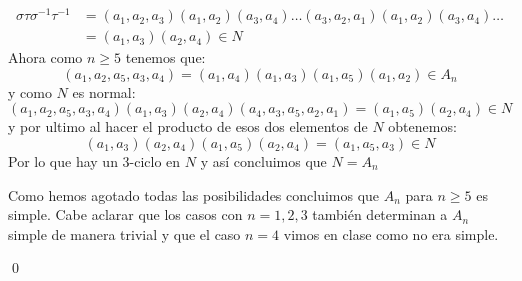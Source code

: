 \begin{homeworkProblem}
\begin{solucion}
\begin{itemize}
\begin{align*}
                    \sigma\tau\sigma^{-1}\tau^{-1}&=(a_1,a_2,a_3)(a_1,a_2)(a_3,a_4)\dotsc(a_3,a_2,a_1)(a_1,a_2)(a_3,a_4)\dotsc\\
                    &=(a_1,a_3)(a_2,a_4)\in N
                \end{align*}
                Ahora como $n\geq 5$ tenemos que:
                $$(a_1,a_2,a_5,a_3,a_4)=(a_1,a_4)(a_1,a_3)(a_1,a_5)(a_1,a_2)\in A_n$$
                y como $N$ es normal:
                $$(a_1,a_2,a_5,a_3,a_4)(a_1,a_3)(a_2,a_4)(a_4,a_3,a_5,a_2,a_1)=(a_1,a_5)(a_2,a_4)\in N$$
                y por ultimo al hacer el producto de esos dos elementos de $N$ obtenemos:
                $$(a_1,a_3)(a_2,a_4)(a_1,a_5)(a_2,a_4)=(a_1,a_5,a_3)\in N$$
                Por lo que hay un 3-ciclo en $N$ y así concluimos que $N=A_n$
            \end{itemize}
            Como hemos agotado todas las posibilidades concluimos que $A_n$ para $n\geq 5$ es simple. Cabe aclarar que los casos con $n=1,2,3$ también determinan a $A_n$ simple de manera trivial y que el caso $n=4$ vimos en clase como no era simple.
            
            \qed
    \end{solucion}
\end{homeworkProblem}
\newpage
